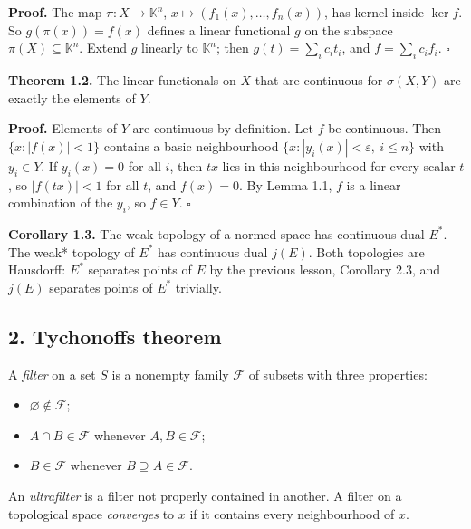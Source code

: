 \documentclass[
  english,
  11pt,
  a4paper,
]{article}
\newcounter{none} %
\providecommand{\tightlist}{%
  \setlength{\itemsep}{0pt}\setlength{\parskip}{0pt}}
\begin{document}
\textbf{Proof.} The map \(\pi:X\to\mathbb K^n\),
\(x\mapsto(f_1(x),\dots,f_n(x))\), has kernel inside \(\ker f\). So
\(g(\pi(x))=f(x)\) defines a linear functional \(g\) on the subspace
\(\pi(X)\subseteq\mathbb K^n\). Extend \(g\) linearly to
\(\mathbb K^n\); then \(g(t)=\sum_ic_it_i\), and \(f=\sum_ic_if_i\).
\(\square\)

\textbf{Theorem 1.2.} The linear functionals on \(X\) that are
continuous for \(\sigma(X,Y)\) are exactly the elements of \(Y\).

\textbf{Proof.} Elements of \(Y\) are continuous by definition. Let
\(f\) be continuous. Then \(\{x:|f(x)|<1\}\) contains a basic
neighbourhood \(\{x:|y_i(x)|<\varepsilon,\ i\le n\}\) with \(y_i\in Y\).
If \(y_i(x)=0\) for all \(i\), then \(tx\) lies in this neighbourhood
for every scalar \(t\), so \(|f(tx)|<1\) for all \(t\), and \(f(x)=0\).
By Lemma 1.1, \(f\) is a linear combination of the \(y_i\), so
\(f\in Y\). \(\square\)

\textbf{Corollary 1.3.} The weak topology of a normed space has
continuous dual \(E^*\). The weak* topology of \(E^*\) has continuous
dual \(j(E)\). Both topologies are Hausdorff: \(E^*\) separates points
of \(E\) by the previous lesson, Corollary 2.3, and \(j(E)\) separates
points of \(E^*\) trivially.

\subsection[2. Tychonoff\textquotesingle s
theorem]{\texorpdfstring{\protect\hypertarget{weak-topologies-tychonoff-banach-alaoglu-mazur-bipolars-krein-milman-and-eberlein-smulian--oa-fnd-wt-02}{}{}2.
Tychonoff\textquotesingle s
theorem}{2. Tychonoff\textquotesingle s theorem}}\label{weak-topologies-tychonoff-banach-alaoglu-mazur-bipolars-krein-milman-and-eberlein-smulian--OA-FND-WT-02}

A \emph{filter} on a set \(S\) is a nonempty family \(\mathcal F\) of
subsets with three properties:

\begin{itemize}
\tightlist
\item
  \(\varnothing\notin\mathcal F\);
\item
  \(A\cap B\in\mathcal F\) whenever \(A,B\in\mathcal F\);
\item
  \(B\in\mathcal F\) whenever \(B\supseteq A\in\mathcal F\).
\end{itemize}

An \emph{ultrafilter} is a filter not properly contained in another. A
filter on a topological space \emph{converges} to \(x\) if it contains
every neighbourhood of \(x\).
\end{document}
